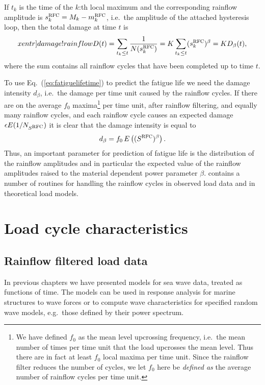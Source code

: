 If $t_k$ is the time of the $k$:th local maximum and the corresponding
rainflow amplitude is $s_k^{{\protect\mbox{\protect\small\protect\sc rfc}}} = M_k - m_k^{{\protect\mbox{\protect\small\protect\sc rfc}}}$, i.e.\
the amplitude of the
attached hysteresis loop, then the total damage at time $t$ is
\begin{equation} \label{eq:rainflowDamage}\index[xentr]{damage!rainflow}
  D(t)=\sum_{t_k\le t}\frac{1}{N(s_k^{\rfc})}=K\sum_{t_k\le
  t}(s_k^{\rfc})^\beta=K D_\beta(t),
\end{equation}
where the sum contains all rainflow cycles that have been completed
up to time $t$.

To use Eq.~(\ref{eq:fatiguelifetime}) to predict the fatigue life we need
the damage intensity $d_\beta$, i.e.\ the damage per time unit caused
by the rainflow cycles. If there are on the average $f_0$
maxima\footnote{We have defined $f_0$ as the mean level upcrossing
frequency, i.e.\ the mean number of times per time unit that the
load upcrosses the mean level. Thus there are in fact at least $f_0$
local maxima per time unit.  Since the rainflow filter reduces the number
of cycles, we let $f_0$ here be {\it defined as} the average number of
rainflow cycles per time unit.}
per time unit, after rainflow filtering,
and equally many rainflow cycles, and each rainflow cycle
causes an expected damage $\epsilon E(1/N_{S^{{\protect\mbox{\protect\small\protect\sc rfc}}}})$
it is clear that the damage intensity is equal to
$$
d_\beta = {f_0}\, E\left((S^{{\protect\mbox{\protect\small\protect\sc rfc}}})^\beta \right).
$$
Thus, an important parameter for prediction of fatigue life is the
distribution of the rainflow amplitudes and in particular the expected
value of the rainflow amplitudes raised to the material dependent
power parameter $\beta$. \progname{} contains a number
of routines for handling the rainflow cycles in observed load data
and in theoretical load models. \index[xentr]{fatigue|)}

\section{Load cycle characteristics}
\label{sec:loadcycle}

\subsection{Rainflow filtered load data}
\label{sec:rainflowfilter}

In  previous chapters we have presented models for sea wave data,
treated as functions of time. The models can be used in response
analysis for marine structures to wave forces or to compute wave
characteristics for specified random wave models, e.g.\ those defined
by their power spectrum.

